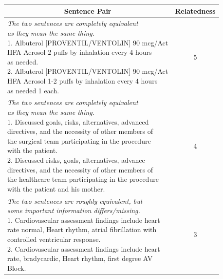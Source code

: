 \begin{enumerate}
	\begin{table}[ht!]
		\centering 	
		\begin{tabular}{l|c} 
			\hline
			\multicolumn{1}{c|}{\textbf{Sentence Pair}} & 
			\multicolumn{1}{c}{\textbf{Relatedness}}  \\
			\hline
			\makecell[l]
			{\textit{The two sentences are completely equivalent}  \\ \textit{as they mean the same thing.} \\
				1. Albuterol [PROVENTIL/VENTOLIN] 90 mcg/Act \\ HFA Aerosol 2 puffs by
				inhalation every 4 hours \\ as needed. \\ 
				2. Albuterol [PROVENTIL/VENTOLIN] 90 mcg/Act \\ HFA Aerosol 1-2 puffs by inhalation every 4 hours \\ as needed 1 each.} & 5  \\
			\hline
			\makecell[l]
			{\textit{The two sentences are completely equivalent}  \\ \textit{as they mean the same thing.} \\
				1. Discussed goals, risks, alternatives, advanced \\ directives, and the necessity of other members of \\ the surgical team participating in the procedure \\ with the patient. \\ 
				2. Discussed risks, goals, alternatives, advance \\ directives, and the necessity of other members of \\ the healthcare team participating in the procedure \\ with the patient
				and his mother.} & 4  \\
			\hline
			\makecell[l]
			{\textit{The two sentences are roughly equivalent, but }  \\ \textit{some important information differs/missing.} \\
				1. Cardiovascular assessment findings include heart \\ rate normal, Heart rhythm, atrial fibrillation with \\controlled ventricular response. \\ 
				2. Cardiovascular assessment findings include heart \\ rate, bradycardic, Heart rhythm, first degree AV \\ Block.} & 3  \\
			\hline
			

\end{tabular}
\end{table}
\end{enumerate}
